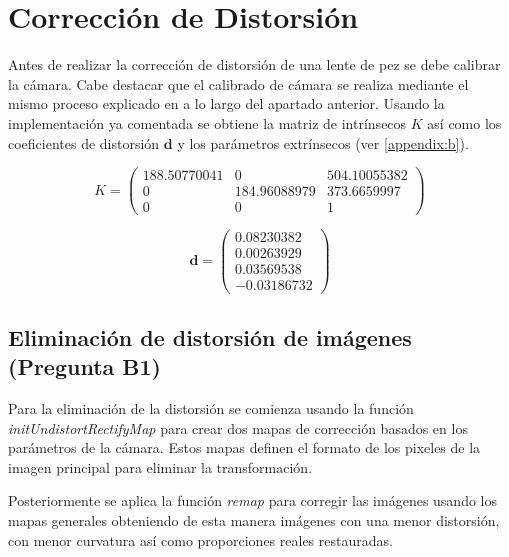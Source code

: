 \documentclass[a4paper,12pt]{article}
\begin{document}
{\begin{figure}[h]
\end{figure}

\newpage


\section{Corrección de Distorsión}


\vspace{1cm}

Antes de realizar la corrección de distorsión de una lente de pez se debe calibrar la cámara. Cabe destacar que el calibrado de cámara se realiza mediante el mismo proceso explicado en a lo largo del apartado anterior. Usando la implementación ya comentada se obtiene la matriz de intrínsecos $K$ así como los coeficientes de distorsión $\mathbf{d}$ y los parámetros extrínsecos (ver \ref{appendix:b}).

\[
K = \begin{pmatrix}
188.50770041 & 0 & 504.10055382 \\
0 & 184.96088979 & 373.6659997 \\
0 & 0 & 1
\end{pmatrix}
\]

\[
\mathbf{d} = \begin{pmatrix}
0.08230382 \\
0.00263929 \\
0.03569538 \\
-0.03186732
\end{pmatrix}
\]
\subsection{Eliminación de distorsión de imágenes (Pregunta B1)}

\vspace{0.5cm}

Para la eliminación de la distorsión se comienza usando la función \textit{initUndistortRectifyMap} para crear dos mapas de corrección basados en los parámetros de la cámara. Estos mapas definen el formato de los pixeles de la imagen principal para eliminar la transformación. 

Posteriormente se aplica la función \textit{remap} para corregir las imágenes usando los mapas generales obteniendo de esta manera imágenes con una menor distorsión, con menor curvatura así como proporciones reales restauradas.

\newpage

}
\end{document}
